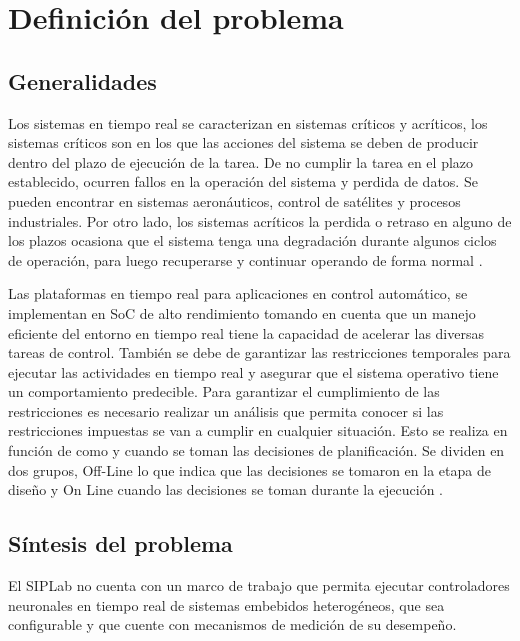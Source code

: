 \documentclass[12pt]{article}
\begin{document}
\newpage

\section{Definición del problema}

\subsection{Generalidades}



Los sistemas en tiempo real se caracterizan en sistemas críticos y acríticos, los sistemas críticos son en los que las acciones del sistema se deben de producir dentro del plazo de ejecución de la tarea. De no cumplir la tarea en el plazo establecido, ocurren fallos en la operación del sistema y perdida de datos. Se pueden encontrar en sistemas aeronáuticos, control de satélites y procesos industriales. Por otro lado, los sistemas acríticos la perdida o retraso en alguno de los plazos ocasiona que el sistema tenga una degradación durante algunos ciclos de operación, para luego recuperarse y continuar operando de forma normal \cite{de2000introduccion} \cite{alonso2010panoramica}.

Las plataformas en tiempo real para aplicaciones en control automático, se implementan en SoC de alto rendimiento tomando en cuenta que un manejo eficiente del entorno en tiempo real tiene la capacidad de acelerar las diversas tareas de control. También se debe de garantizar las restricciones temporales para ejecutar las actividades en tiempo real y asegurar que el sistema operativo tiene un comportamiento predecible. Para garantizar el cumplimiento de las restricciones es necesario realizar un análisis que permita conocer si las restricciones impuestas se van a cumplir en cualquier situación. Esto se realiza en función de como y cuando se toman las decisiones de planificación. Se dividen en dos grupos, Off-Line lo que indica que las decisiones se tomaron en la etapa de diseño y On Line cuando las decisiones se toman durante la ejecución \cite{munoz1994extensiones} \cite{alonso2010panoramica}.


\subsection{Síntesis del problema}

El SIPLab no cuenta con un marco de trabajo que permita ejecutar controladores neuronales en tiempo real de sistemas embebidos heterogéneos, que sea configurable y que cuente con mecanismos de medición de su desempeño.
\end{document}
